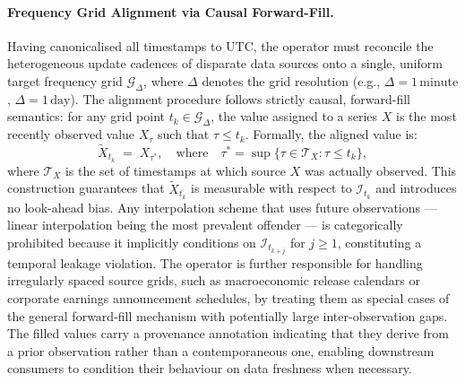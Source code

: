 \documentclass[12pt,openany]{book}
\numberwithin{equation}{chapter}
\theoremstyle{plain}
\theoremstyle{definition}
\theoremstyle{remark}
\begin{document}
\paragraph{Frequency Grid Alignment via Causal Forward-Fill.}
Having canonicalised all timestamps to UTC, the operator must reconcile the heterogeneous update
cadences of disparate data sources onto a single, uniform target frequency grid $\mathcal{G}_\Delta$,
where $\Delta$ denotes the grid resolution (e.g., $\Delta = 1\,\text{minute}$, $\Delta =
1\,\text{day}$). The alignment procedure follows strictly causal, forward-fill semantics: for any
grid point $t_k \in \mathcal{G}_\Delta$, the value assigned to a series $X$ is the most recently
observed value $X_{\tau}$ such that $\tau \leq t_k$. Formally, the aligned value is:
\begin{equation}
    \tilde{X}_{t_k} \;=\; X_{\tau^*}, \quad \text{where} \quad
    \tau^* = \sup\bigl\{\tau \in \mathcal{T}_X : \tau \leq t_k\bigr\},
\end{equation}
where $\mathcal{T}_X$ is the set of timestamps at which source $X$ was actually observed. This
construction guarantees that $\tilde{X}_{t_k}$ is measurable with respect to $\mathcal{I}_{t_k}$
and introduces no look-ahead bias. Any interpolation scheme that uses future observations — linear
interpolation being the most prevalent offender — is categorically prohibited because it implicitly
conditions on $\mathcal{I}_{t_{k+j}}$ for $j \geq 1$, constituting a temporal leakage violation.
The operator is further responsible for handling irregularly spaced source grids, such as
macroeconomic release calendars or corporate earnings announcement schedules, by treating them as
special cases of the general forward-fill mechanism with potentially large inter-observation gaps.
The filled values carry a provenance annotation indicating that they derive from a prior observation
rather than a contemporaneous one, enabling downstream consumers to condition their behaviour on
data freshness when necessary.
\end{document}
